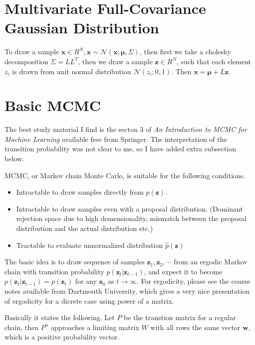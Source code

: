 \documentclass[a4]{article}
\begin{document}
\section{Multivariate Full-Covariance Gaussian Distribution}
To draw a sample $\bm{x} \in R^N, \bm{x} \sim \mathcal{N}(\bm{x}; \bm{\mu}, \Sigma)$, then first 
we take a cholesky decomposition $\Sigma = LL^T$, then we draw a sample $\bm{z} \in R^N$,
such that each element $z_i$ is drawn from unit normal distribution $\mathcal{N}(z_i; 0, 1)$.
Then $\bm{x} = \bm{\mu} + L\bm{z}$.



\section{Basic MCMC}
The best study material I find is the secton 3 of 
\textit{An Introduction to MCMC for Machine Learning}\cite{intro_mcmc} available free from Springer.
The interpretation of the transition probability was not clear to me, so I have added extra subsection below.

MCMC, or Markov chain Monte Carlo, is suitable for the following conditions.
\begin{itemize}
\item Intractable to draw samples directly from $p(\bm{z})$.
\item Intractable to draw samples even with a proposal distribution. (Dominant rejection space due to high demensionality, mismatch between the proposal distribution and the actual distribution etc.)
\item Tractable to evaluate unnormalized distribution $\hat{p}(\bm{z})$
\end{itemize}

The basic idea is to draw sequence of samples $\bm{z}_1, \bm{z}_2, \cdots$ from
an ergodic Markov chain with transition probability $p(\bm{z}_{t}|\bm{z}_{t-1})$,
and expect it to become $p(\bm{z}_{t}|\bm{z}_{t-1}) = p(\bm{z}_{t})$ for any $\bm{z}_0$ as $t \rightarrow \infty$.
For ergodicity, please see the course notes \cite{ergodic_mc} available from Dartmouth University,
which gives a very nice presentation of ergodicity for a dicrete case using power of a matrix.

Basically it states the following.
Let $P$ be the transtion matrix for a regular chain, then $P^n$ approaches a limiting matrix $W$ with all rows the
same vector $\bm{w}$, which is a positive probability vector.
\end{document}
